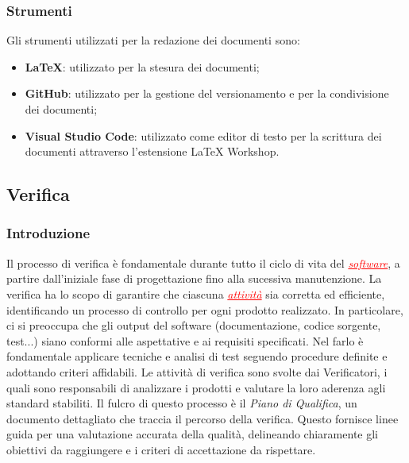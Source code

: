 \begin{itemize}
\subsubsection{Strumenti}
Gli strumenti utilizzati per la redazione dei documenti sono:
\begin{itemize}
    \item \textbf{\LaTeX{}}: utilizzato per la stesura dei documenti;
    \item \textbf{GitHub}: utilizzato per la gestione del versionamento e per la condivisione dei documenti;
    \item \textbf{Visual Studio Code}: utilizzato come editor di testo per la scrittura dei documenti attraverso l'estensione \LaTeX{} Workshop.
\end{itemize}

\subsection{Verifica}
\subsubsection{Introduzione}
Il processo di verifica è fondamentale durante tutto il ciclo di vita del \textcolor{red}{\uline{\textit{software}}}, a partire dall'iniziale fase
di progettazione fino alla sucessiva manutenzione. La verifica ha lo scopo di garantire che ciascuna \textcolor{red}{\uline{\textit{attività}}}
sia corretta ed efficiente, identificando un processo di controllo per ogni prodotto realizzato. In particolare, ci si preoccupa che gli output
del software (documentazione, codice sorgente, test...) siano conformi alle aspettative e ai requisiti specificati. Nel farlo è fondamentale
applicare tecniche e analisi di test seguendo procedure definite e adottando criteri affidabili.
Le attività di verifica sono svolte dai Verificatori, i quali sono responsabili di analizzare i prodotti e valutare la loro aderenza agli standard
stabiliti. Il fulcro di questo processo è il \textit{Piano di Qualifica}, un documento dettagliato che traccia il percorso della verifica.
Questo fornisce linee guida per una valutazione accurata della qualità, delineando chiaramente gli obiettivi da raggiungere e i criteri di
accettazione da rispettare.


\end{itemize}
